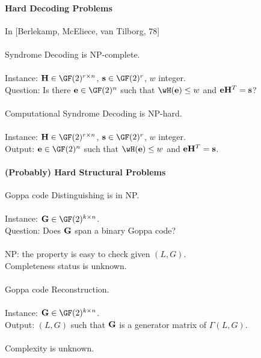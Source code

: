 \documentclass[a4paper, 11pt, openany]{book}
\begin{document}







\paragraph{Hard Decoding Problems}

In [Berlekamp, McEliece,  van Tilborg, 78]\\
~\\
Syndrome Decoding is NP-complete.\\
~\\
Instance: ${\bf H} \in \GF(2)^{r \times n}$, ${\bf s} \in \GF(2)^r$, $w$ integer.\\
Question: Is there ${\bf e} \in \GF(2)^n$ such that $\wH({\bf e}) \le w$ and ${\bf e} {\bf H}^T = {\bf s}$?\\
~\\
Computational Syndrome Decoding is NP-hard.\\
~\\
Instance: ${\bf H} \in \GF(2)^{r \times n}$, ${\bf s} \in \GF(2)^r$, $w$ integer.\\
Output: ${\bf e} \in \GF(2)^n$ such that $\wH({\bf e}) \le w$ and ${\bf e} {\bf H}^T = {\bf s}$.



\paragraph{(Probably) Hard Structural Problems}

Goppa code Distinguishing is in NP.\\
~\\
Instance: ${\bf G} \in \GF(2)^{k \times n}$.\\
Question: Does ${\bf G}$ span a binary Goppa code?\\
~\\
NP: the property is easy to check given $(L, G)$.\\
Completeness status is unknown.\\
~\\
Goppa code Reconstruction.\\
~\\
Instance: ${\bf G} \in \GF(2)^{k \times n}$.\\
Output: $(L, G)$ such that ${\bf G}$ is a generator matrix of $\Gamma(L,G)$.\\
~\\
Complexity is unknown.
\end{document}
